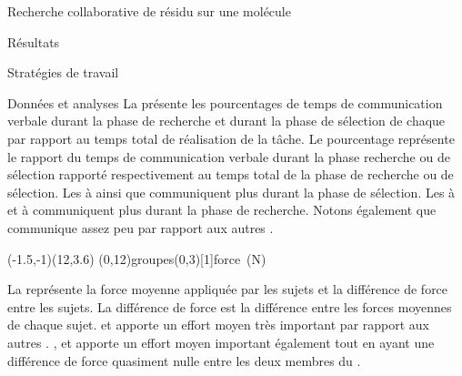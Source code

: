 \documentclass[myfrancais,ngerman,english,frenchb]{mythesis}
\begin{document}
\begin{mychapter}{Recherche collaborative de résidu sur une molécule}
\begin{mysection}{Résultats}
\begin{mysubsection}{Stratégies de travail}
\begin{mysubsubsection}{Données et analyses}
					La  présente les pourcentages de temps de communication verbale durant la phase de recherche et durant la phase de sélection de chaque  par rapport au temps total de réalisation de la tâche.
					Le pourcentage représente le rapport du temps de communication verbale durant la phase recherche ou de sélection rapporté respectivement au temps total de la phase de recherche ou de sélection.
					Les   à  ainsi que  communiquent plus durant la phase de sélection.
					Les   à  et  à  communiquent plus durant la phase de recherche.
					Notons également que  communique assez peu par rapport aux autres .

					\begin{myfigure}
						\begin{myps}(-1.5,-1)(12,3.6)
							\myaxes(0,12){groupes}(0,3)[1]{force~(N)}
						\end{myps}
					\end{myfigure}

					La  représente la force moyenne appliquée par les sujets  et la différence de force entre les sujets.
					La différence de force est la différence entre les forces moyennes de chaque sujet.
					 et  apporte un effort moyen très important par rapport aux autres .
					,  et  apporte un effort moyen important également tout en ayant une différence de force quasiment nulle entre les deux membres du .


\end{mysubsubsection}
\end{mysubsection}
\end{mysection}
\end{mychapter}
\end{document}
